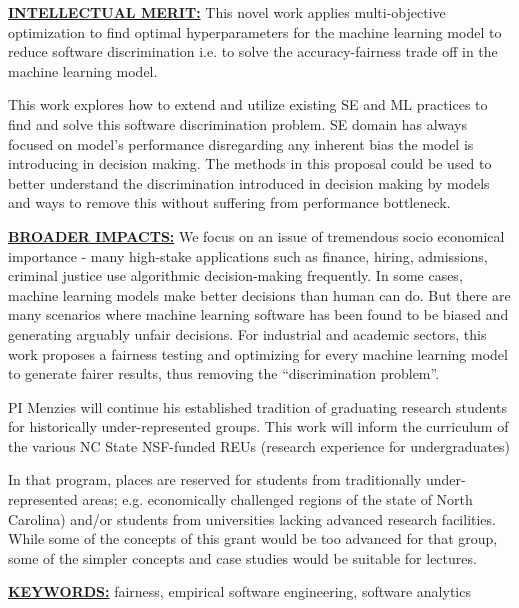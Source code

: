 \documentclass{NSF}
\begin{document}
\begin{nsfsummary}
\vspace{5mm}
 \noindent
\underline{{\bf INTELLECTUAL MERIT:}} 
This novel work applies multi-objective optimization to find optimal hyperparameters for the machine learning model to reduce software discrimination i.e. to solve the accuracy-fairness trade off in the machine learning model.

This work explores how to extend and utilize existing SE and ML practices to find and solve this software discrimination problem. SE domain has always focused on model's performance disregarding any inherent bias the model is introducing in decision making. The methods in this proposal could be used to better understand the discrimination introduced in decision making by models and ways to remove this without suffering from performance bottleneck.


 
 
\vspace{5mm}
\noindent
\underline{{\bf BROADER IMPACTS:}}
We focus on an issue of tremendous socio economical importance - many high-stake applications such as finance, hiring, admissions, criminal justice use algorithmic decision-making frequently. In some cases, machine learning models make better decisions than human can do. But there are many scenarios where machine learning software has been found to be biased and generating arguably unfair decisions. For industrial and academic sectors, this work proposes a fairness testing and optimizing for every machine learning model to generate fairer results, thus removing the ``discrimination problem''.

PI Menzies will continue his established tradition of graduating research students for historically under-represented groups. This work will inform the curriculum of  the various NC State  NSF-funded REUs (research experience for undergraduates)

In that program, places are reserved for students from traditionally under-represented areas; e.g. economically challenged regions of the state of North Carolina) and/or students from universities lacking advanced research facilities. While some of the concepts of this grant would be too advanced for that group, some of the simpler concepts and case studies would be suitable for lectures.

\vspace{5mm}

\noindent \underline{{\bf KEYWORDS:}} fairness, empirical software engineering, software analytics
\end{nsfsummary}
\end{document}
